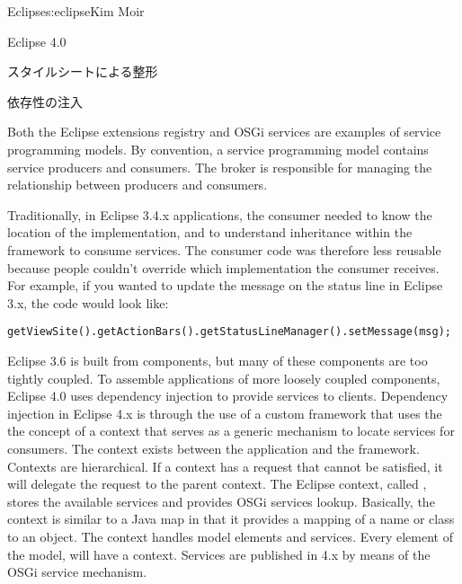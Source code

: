 \begin{aosachapter}{Eclipse}{s:eclipse}{Kim Moir}
\begin{aosasect1}{Eclipse 4.0}
\begin{aosasect2}{スタイルシートによる整形}
\end{aosasect2}

\begin{aosasect2}{依存性の注入}

Both the Eclipse extensions registry and OSGi services are examples of service
programming models. By convention, a service programming model contains service
producers and consumers. The broker is responsible for managing the
relationship between producers and consumers.


\pagebreak

Traditionally, in Eclipse 3.4.x applications, the consumer needed
to know the location of the implementation, and to
understand inheritance within the framework to
consume services. The consumer code was therefore less reusable
because people couldn't override which implementation the consumer
receives. For example, if you wanted to update the message on the
status line in Eclipse 3.x, the code would look like:

\begin{verbatim}
getViewSite().getActionBars().getStatusLineManager().setMessage(msg);
\end{verbatim}

Eclipse 3.6 is built from components, but many of these components are
too tightly coupled. To assemble applications of more loosely coupled
components, Eclipse 4.0 uses dependency injection to provide services
to clients. Dependency injection in Eclipse 4.x is through the use of
a custom framework that uses the the concept of a context that serves
as a generic mechanism to locate services for consumers.  The context
exists between the application and the framework. Contexts are
hierarchical. If a context has a request that cannot be satisfied,
it will delegate the request to the parent context. The Eclipse
context, called , stores the available services and
provides OSGi services lookup.  Basically, the context is similar to a
Java map in that it provides a mapping of a name or class to an
object.  The context handles model elements and services.  Every
element of the model, will have a context. Services are published in
4.x by means of the OSGi service mechanism.


\end{aosasect2}
\end{aosasect1}
\end{aosachapter}
